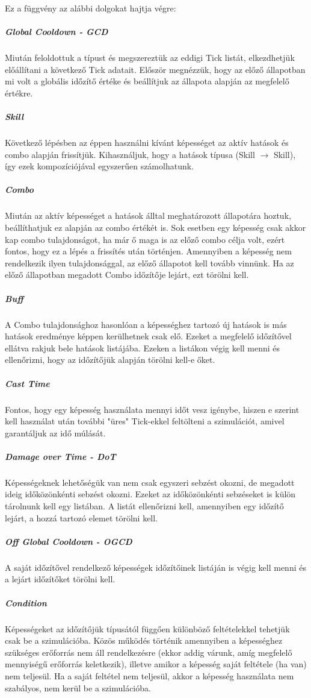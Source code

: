\documentclass[12pt]{article}
\begin{document}
	Ez a függvény az alábbi dolgokat hajtja végre:
	
	\subparagraph{Global Cooldown - GCD} 
	Miután feloldottuk a típust és megszereztük az eddigi Tick listát, elkezdhetjük előállítani a következő Tick adatait.
	Először megnézzük, hogy az előző állapotban mi volt a globális időzítő értéke és beállítjuk az állapota alapján az megfelelő értékre.
	
	\subparagraph{Skill}
	Következő lépésben az éppen használni kívánt képességet az aktív hatások és combo alapján frissítjük. Kihasználjuk, hogy a hatások típusa (Skill $\rightarrow$ Skill), így ezek kompozíciójával egyszerűen számolhatunk.
	
	\subparagraph{Combo}
	Miután az aktív képességet a hatások álltal meghatározott állapotára hoztuk, beállíthatjuk ez alapján az combo értékét is. Sok esetben egy képesség csak akkor kap combo tulajdonságot, ha már ő maga is az előző combo célja volt, ezért fontos, hogy ez a lépés a frissítés után történjen.
	Amennyiben a képesség nem rendelkezik ilyen tulajdonsággal, az előző állapotot kell tovább vinnünk. Ha az előző állapotban megadott Combo időzítője lejárt, ezt törölni kell.
	
	\subparagraph{Buff}
	A Combo tulajdonsághoz hasonlóan a képességhez tartozó új hatások is más hatások eredménye képpen kerülhetnek csak elő. Ezeket a megfelelő időzítővel ellátva rakjuk bele hatások listájába.
	Ezeken a listákon végig kell menni és ellenőrizni, hogy az időzítőjük alapján törölni kell-e őket. 
	
	\subparagraph{Cast Time}
	Fontos, hogy egy képesség használata mennyi időt vesz igénybe, hiszen e szerint kell használat után további "üres" Tick-ekkel feltölteni a szimulációt, amivel garantáljuk az idő múlását.
	
	\subparagraph{Damage over Time - DoT}
	Képességeknek lehetőségük van nem csak egyszeri sebzést okozni, de megadott ideig időközönkénti sebzést okozni. Ezeket az időközönkénti sebzéseket is külön tárolnunk kell egy listában.
	A listát ellenőrizni kell, amennyiben egy időzítő lejárt, a hozzá tartozó elemet törölni kell.
	
	\subparagraph{Off Global Cooldown - OGCD}
	A saját időzítővel rendelkező képességek időzítőinek listáján is végig kell menni és a lejárt időzítőket törölni kell.
	
	\subparagraph{Condition}
	Képességeket az időzítőjük típusától függően különböző feltételekkel tehetjük csak be a szimulációba.
	Közös működés történik amennyiben a képességhez szükséges erőforrás nem áll rendelkezésre (ekkor addig várunk, amíg megfelelő mennyiségű erőforrás keletkezik), illetve amikor a képesség saját feltétele (ha van) nem teljesül. Ha a saját feltétel nem teljesül, akkor a képesség használata nem szabályos, nem kerül be a szimulációba.
	
\end{document}
